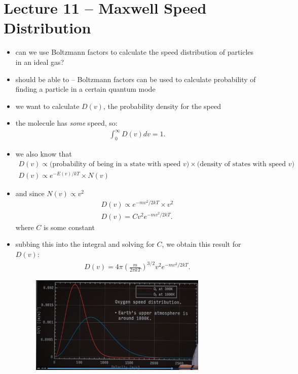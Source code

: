 \documentclass[10pt]{article}
\begin{document}
\section{Lecture 11 -- Maxwell Speed Distribution}
\begin{itemize}
    \item can we use Boltzmann factors to calculate the speed distribution of particles in an ideal gas?
    \item should be able to -- Boltzmann factors can be used to calculate probability of finding a particle in a certain quantum mode
    \item we want to calculate $D(v)$, the probability density for the speed
    \item the molecule has \textit{some} speed, so: 
        \begin{gather*}
            \int_{0}^{\infty} D(v) dv = 1
        .\end{gather*}
    \item we also know that 
        \begin{gather*}
            D(v) \propto \text{(probability of being in a state with speed $v$)} \times \text{(density of states with speed $v$)} \\ 
            D(v) \propto e^{-E(v) / kT} \times N(v)
        \end{gather*}
    \item and since $N(v) \propto v^2$
         \begin{gather*}
            D(v) \propto e^{-mv^2 / 2kT} \times v^2 \\ 
            D(v) = Cv^2 e^{-mv^2 / 2kT}
        .\end{gather*}
        where $C$ is some constant
    \item subbing this into the integral and solving for $C$, we obtain this result for $D(v)$: 
        \begin{gather*}
            D(v) = 4\pi \left( \frac{m}{2\pi kT} \right)^{3 / 2} v^2 e^{-mv^2 / 2kT}
        .\end{gather*}
        \begin{figure}[H]
            \centering
            \includegraphics[width=0.8\textwidth]{speedDistribution}

\end{figure}
\end{itemize}
\end{document}
